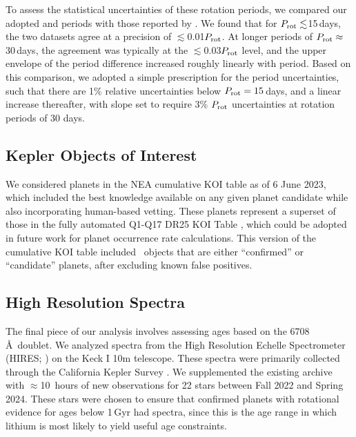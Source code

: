 \documentclass[11pt,twocolumn,tighten]{aastex63}
\begin{document}
To assess the statistical uncertainties of these rotation periods, we
compared our adopted  and
 periods with those reported by
\citet{McQuillan_2014}.  We found that for $P_{\rm
rot}\lesssim$15\,days, the two datasets agree at a precision of
$\lesssim$0.01$P_{\rm rot}$.  At longer periods of $P_{\rm
rot}\approx$30\,days, the agreement was typically at the
$\lesssim$0.03$P_{\rm rot}$ level, and the upper envelope of the
period difference increased roughly linearly with period.  Based on
this comparison, we adopted a simple prescription for the period
uncertainties, such that there are 1\% relative uncertainties below
$P_{\rm rot}=15$\,days, and a linear increase thereafter, with slope
set to require 3\% $P_{\rm rot}$ uncertainties at rotation periods of
30 days.







\subsection{Kepler Objects of Interest}
\label{subsec:planetsel}

We considered planets in the NEA cumulative KOI table as of 6 June
2023, which included the best knowledge available on any given planet
candidate while also incorporating human-based vetting.  These planets
represent a superset of those in the fully automated Q1-Q17 DR25 KOI
Table \citep{Thompson_2018}, which could be adopted in future work for
planet occurrence rate calculations.  This version of the cumulative
KOI table included \nkoisnofp\ objects that are either ``confirmed''
or ``candidate'' planets, after excluding known false positives. 

\subsection{High Resolution Spectra}
\label{subsec:lithiumsel}

The final piece of our analysis involves assessing ages based on the
 6708\,\AA\ doublet.  We analyzed spectra
from the High Resolution Echelle Spectrometer (HIRES;
\citealt{vogt_hires_1994}) on the Keck I 10m telescope.  These spectra
were primarily collected through the California Kepler Survey
\citep{2017AJ....154..107P,2017AJ....154..108J,2017AJ....154..109F}.
We supplemented the existing archive with $\approx$10~hours of new
observations for 22 stars between Fall 2022 and Spring 2024.  These
stars were chosen to ensure that confirmed planets with rotational
evidence for ages below 1\,Gyr had spectra, since this is the age
range in which lithium is most likely to yield useful age constraints.
\end{document}
